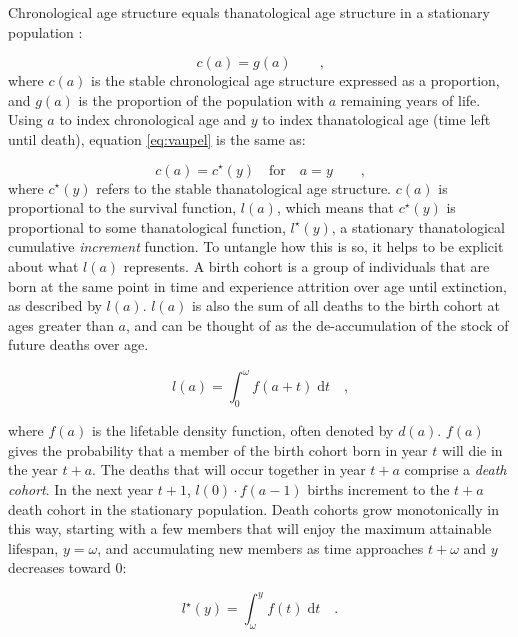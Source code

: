 \documentclass{article}
\newcommand{\dd}{\; \mathrm{d}}
\begin{document}
Chronological age structure equals thanatological age structure in a stationary
population \citep{brouard1989mouvements,vaupel2009life,rao2014generalization}:

\begin{equation}
\label{eq:vaupel}
c(a) = g(a) \quad\quad \text{,}
\end{equation}
where $c(a)$ is the stable chronological age structure expressed as a
proportion, and $g(a)$ is the proportion of the population with $a$ remaining
years of life. Using $a$ to index chronological age and $y$ to index
thanatological age (time left until death), equation \eqref{eq:vaupel} is the
same as:

\begin{equation}
\label{eq:equivalent}
c(a) = c^\star (y) \quad \text{for}\quad a = y \quad\quad\text{,}
\end{equation}
where $c^\star (y)$ refers to the stable thanatological age
structure. $c(a)$ is proportional to the survival
function, $l(a)$, which means that $c^\star(y)$ is proportional to some
thanatological function, $l^\star (y)$, a stationary thanatological cumulative
\textit{increment} function. To untangle how this is so, it helps to be
explicit about what $l(a)$ represents. A birth cohort is a
group of individuals that are born at the same point in time and experience attrition over age until extinction, as described by $l(a)$. $l(a)$ is also
the sum of all deaths to the birth cohort at ages greater than $a$, and can be
thought of as the de-accumulation of the stock of future deaths over age. 

\begin{equation}
l(a) = \int _{0}^\omega f(a+t) \dd t \quad \text{,}
\end{equation}

\noindent where $f(a)$ is the lifetable density function, often denoted by
$d(a)$. $f(a)$ gives the probability that a member of the birth cohort born in year $t$
will die in the year $t+a$. The deaths that will occur together in year
$t+a$ comprise a \textit{death cohort}. In the next year $t+1$,
$l(0)\cdot f(a-1)$ births increment to the $t+a$ death cohort in the stationary
population. Death cohorts grow monotonically in this way, starting with a few
members that will enjoy the maximum attainable lifespan, $ y = \omega$, and
accumulating new members as time approaches $t+\omega$ and $y$ decreases
toward 0:

\begin{equation}
l^\star (y) = \int _\omega^y f(t) \dd t \quad \text{.}
\end{equation}
\end{document}
